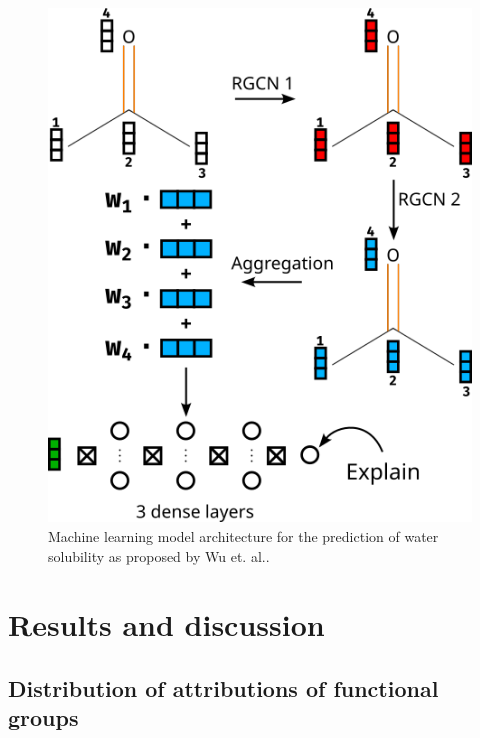 \documentclass[twoside,twocolumn,9pt]{article}
\begin{document}
\begin{figure}[H]
    \centering
    \includegraphics[scale=2]{../data/images/RGCN_model.png}
    \caption{Machine learning model architecture for the prediction of water solubility as proposed by Wu et. al.\cite{wu2023chemistry}.}
\end{figure}


\section{Results and discussion}

\subsection{Distribution of attributions of functional groups}
\end{document}
